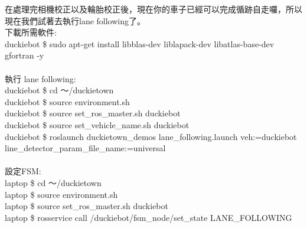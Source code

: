 \documentclass{article}
\begin{document}
在處理完相機校正以及輪胎校正後，現在你的車子已經可以完成循跡自走囉，所以現在我們試著去執行lane following了。
\\下載所需軟件:
\\duckiebot \$ sudo apt-get install libblas-dev liblapack-dev libatlas-base-dev gfortran -y
\\
\\執行 lane following:
\\duckiebot \$ cd ～/duckietown
\\duckiebot \$ source environment.sh
\\duckiebot \$ source set\_ros\_master.sh duckiebot
\\duckiebot \$ source set\_vehicle\_name.sh duckiebot
\\duckiebot \$ roslaunch duckietown\_demos lane\_following.launch veh:=duckiebot \\line\_detector\_param\_file\_name:=universal
\\
\\設定FSM:
\\laptop \$ cd ～/duckietown
\\laptop \$ source environment.sh
\\laptop \$ source set\_ros\_master.sh duckiebot
\\laptop \$ rosservice call /duckiebot/fsm\_node/set\_state LANE\_FOLLOWING
\end{document}
